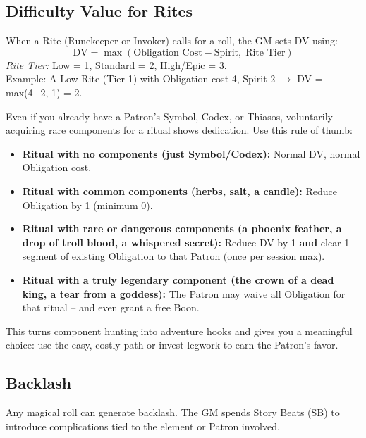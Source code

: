 \subsection{Difficulty Value for Rites}
\label{sec:dv-rites}
When a Rite (Runekeeper or Invoker) calls for a roll, the GM sets DV using:
\[
\text{DV} = \max(\text{Obligation Cost} - \text{Spirit},\; \text{Rite Tier})
\]
\noindent\textit{Rite Tier:} Low = 1, Standard = 2, High/Epic = 3.\\
Example: A Low Rite (Tier 1) with Obligation cost 4, Spirit 2 $\rightarrow$ DV = max(4−2, 1) = 2.

\begin{tcolorbox}[colback=green!5!white,colframe=green!75!black,title=Components as Devotion,breakable]
Even if you already have a Patron's Symbol, Codex, or Thiasos, voluntarily acquiring rare components for a ritual shows dedication. Use this rule of thumb:

\begin{itemize}
  \item \textbf{Ritual with no components (just Symbol/Codex):} Normal DV, normal Obligation cost.
  \item \textbf{Ritual with common components (herbs, salt, a candle):} Reduce Obligation by 1 (minimum 0).
  \item \textbf{Ritual with rare or dangerous components (a phoenix feather, a drop of troll blood, a whispered secret):} Reduce DV by 1 \textbf{and} clear 1 segment of existing Obligation to that Patron (once per session max).
  \item \textbf{Ritual with a truly legendary component (the crown of a dead king, a tear from a goddess):} The Patron may waive all Obligation for that ritual -- and even grant a free Boon.
\end{itemize}
This turns component hunting into adventure hooks and gives you a meaningful choice: use the easy, costly path or invest legwork to earn the Patron's favor.
\end{tcolorbox}

\subsection{Backlash}
\label{sec:magic-backlash}

Any magical roll can generate backlash. The GM spends Story Beats (SB) to introduce complications tied to the element or Patron involved.

